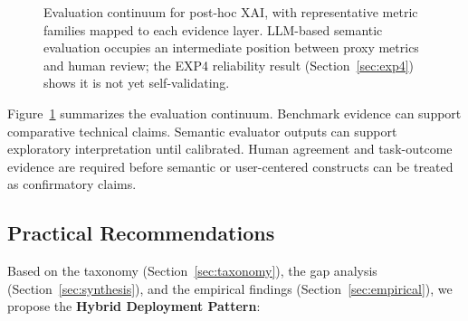 \documentclass[fleqn,10pt,lineno]{wlpeerj}
\begin{document}
\begin{figure}[t]
\caption{Evaluation continuum for post-hoc XAI, with representative metric
families mapped to each evidence layer. LLM-based semantic evaluation
occupies an intermediate position between proxy metrics and human
review; the EXP4 reliability result (Section~\ref{sec:exp4})
shows it is not yet self-validating.}
\label{fig:continuum}
\end{figure}

Figure~\ref{fig:continuum} summarizes the evaluation continuum. Benchmark
evidence can support comparative technical claims. Semantic evaluator
outputs can support exploratory interpretation until calibrated. Human
agreement and task-outcome evidence are required before semantic or
user-centered constructs can be treated as confirmatory claims.

\subsection{Practical Recommendations}
\label{sec:recommendations}

Based on the taxonomy (Section~\ref{sec:taxonomy}), the gap analysis
(Section~\ref{sec:synthesis}), and the empirical findings
(Section~\ref{sec:empirical}), we propose the \textbf{Hybrid Deployment
Pattern}:
\end{document}
